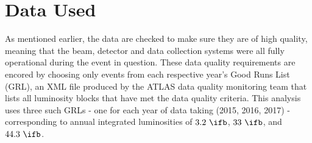 \section{Data Used} \label{sec:data:data}

As mentioned earlier, the data are checked to make sure they are of high
quality, meaning that the beam, detector and data collection systems were all
fully operational during the event in question. These data quality requirements
are encored by choosing only events from each respective year's Good Runs List
(GRL), an XML file produced by the ATLAS data quality monitoring team that
lists all luminosity blocks that have met the data quality criteria.  This
analysis uses three such GRLs - one for each year of data taking
(2015, 2016, 2017) - corresponding to annual integrated luminosities of
$3.2~\ifb$, $33~\ifb$, and $44.3~\ifb$.
